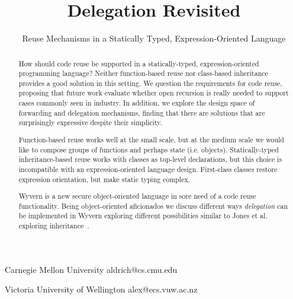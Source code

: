 \documentclass[preprint,10pt]{sigplanconf}
\begin{document}
\setlength{\pdfpageheight}{\paperheight}
\setlength{\pdfpagewidth}{\paperwidth}




\title{Delegation Revisited}
\subtitle{Reuse Mechanisms in a Statically Typed, Expression-Oriented Language}

           {Carnegie Mellon University}
           {aldrich@cs.cmu.edu}

           {Victoria University of Wellington}
           {alex@ecs.vuw.ac.nz}
		   		   
\maketitle

\begin{abstract}
How should code reuse be supported in a statically-typed,
expression-oriented programming language?  Neither function-based
reuse nor class-based inheritance provides a good solution in this
setting.  We question the requirements for code reuse, proposing that
future work evaluate whether open recursion is really needed to support
cases commonly seen in industry.  In addition, we explore the design
space of forwarding and delegation mechanisms, finding that there are
solutions that are surprisingly expressive despite their simplicity.

Function-based reuse works well
at the small scale, but at the medium scale we would like to compose groups
of functions and perhaps state (i.e. objects).  Statically-typed
inheritance-based reuse works with classes as top-level declarations, but
this choice is incompatible with an expression-oriented language design.
First-class classes restore expression orientation, but make static typing
complex.

Wyvern is a new secure object-oriented language in sore need of a code reuse functionality. Being object-oriented aficionados we discuss different ways \textit{delegation} can be implemented in Wyvern exploring different possibilities similar to Jones et al. exploring inheritance~\cite{jones:2016:inheritance}.
\end{abstract}
\end{document}
